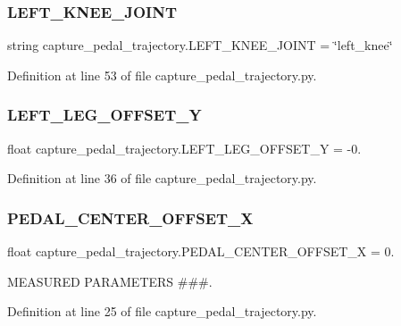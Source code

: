 \subsubsection{\texorpdfstring{LEFT\_KNEE\_JOINT}{LEFT\_KNEE\_JOINT}}
{\footnotesize\ttfamily string capture\+\_\+pedal\+\_\+trajectory.\+L\+E\+F\+T\+\_\+\+K\+N\+E\+E\+\_\+\+J\+O\+I\+NT = \char`\"{}left\+\_\+knee\char`\"{}}



Definition at line 53 of file capture\+\_\+pedal\+\_\+trajectory.\+py.

\mbox{\label{namespacecapture__pedal__trajectory_a624e3b2ffb27de7ac8ef0f742d2902c5}} 
\subsubsection{\texorpdfstring{LEFT\_LEG\_OFFSET\_Y}{LEFT\_LEG\_OFFSET\_Y}}
{\footnotesize\ttfamily float capture\+\_\+pedal\+\_\+trajectory.\+L\+E\+F\+T\+\_\+\+L\+E\+G\+\_\+\+O\+F\+F\+S\+E\+T\+\_\+Y = -\/0.}



Definition at line 36 of file capture\+\_\+pedal\+\_\+trajectory.\+py.

\mbox{\label{namespacecapture__pedal__trajectory_a3d0288c92be21566c30d330ec9b04ddf}} 
\subsubsection{\texorpdfstring{PEDAL\_CENTER\_OFFSET\_X}{PEDAL\_CENTER\_OFFSET\_X}}
{\footnotesize\ttfamily float capture\+\_\+pedal\+\_\+trajectory.\+P\+E\+D\+A\+L\+\_\+\+C\+E\+N\+T\+E\+R\+\_\+\+O\+F\+F\+S\+E\+T\+\_\+X = 0.}



M\+E\+A\+S\+U\+R\+ED P\+A\+R\+A\+M\+E\+T\+E\+RS \#\#\#. 



Definition at line 25 of file capture\+\_\+pedal\+\_\+trajectory.\+py.

